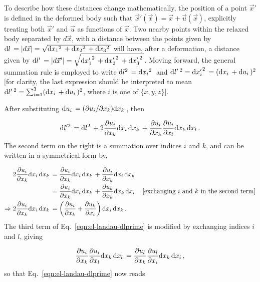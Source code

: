 To describe how these distances change mathematically, the position of a point $\vec{x}'$ is defined in the deformed body such that $\vec{x}'(\vec{x}) = \vec{x} + \vec{u}(\vec{x})$, explicitly treating both $\vec{x}'$ and $\vec{u}$ as functions of $\vec{x}$.  Two nearby points within the relaxed body separated by $d\vec{x}$, with a distance between the points given by ${\text{d}l}\, = |d\vec{x}| = \sqrt{{\text{d}{x_1}^2}\, + {\text{d}{x_2}^2}\, + {\text{d}{x_3}^2}\,}$ will have, after a deformation, a distance given by ${\text{d}l'}\, = |d\vec{x}'| = \sqrt{{\text{d}{x'_1}^2}\, + {\text{d}{x'_2}^2}\, + {\text{d}{x'_3}^2}\,}$.  Moving forward, the general summation rule is employed to write ${\text{d}l^2}\, = {\text{d}{x_i}^2}\,$ and ${\text{d}l'}\,^2 = {\text{d}{x'_i}^2}\, = ({\text{d}x_i}\, + {\text{d}u_i}\,)^2$ [for clarity, the last expression should be interpreted to mean ${\text{d}l'}\,^2 = \sum_{i=1}^{3} ({\text{d}x_i}\, + {\text{d}u_i}\,)^2$, where $i$ is one of $\{x, y, z\}$].

After substituting ${\text{d}u_i}\, = (\partial u_i/\partial x_k){\text{d}x_k}\,$, then

\begin{equation}\label{eqn:el-landau-dlprime}
{\text{d}l'^2}\, = {\text{d}l^2}\, + 2 \frac{\partial u_i}{\partial x_k}{\text{d}x_i}\, {\text{d}x_k}\, + \frac{\partial u_i}{\partial x_k}\frac{\partial u_i}{\partial x_l}{\text{d}x_k}\,{\text{d}x_l}\,.
\end{equation}
%
The second term on the right is a summation over indices $i$ and $k$, and can be written in a symmetrical form by,

\begin{align*}
2 \frac{\partial u_i}{\partial x_k}{\text{d}x_i}\, {\text{d}x_k}\, 
    &= \frac{\partial u_i}{\partial x_k} {\text{d}x_i}\, {\text{d}x_k}\, + \frac{\partial u_i}{\partial x_k} {\text{d}x_i}\, {\text{d}x_k}\, \\
    &= \frac{\partial u_i}{\partial x_k} {\text{d}x_i}\, {\text{d}x_k}\, + \frac{\partial u_k}{\partial x_k} {\text{d}x_k}\, {\text{d}x_i}\, & \text{[exchanging $i$ and $k$ in the second term]} \\
\Rightarrow 2 \frac{\partial u_i}{\partial x_k}{\text{d}x_i}\, {\text{d}x_k}\, &= \left( \frac{\partial u_i}{\partial x_k} + \frac{\partial u_k}{\partial x_i}\right) {\text{d}x_i}\, {\text{d}x_k}\,. 
\end{align*}
%
The third term of Eq.~\ref{eqn:el-landau-dlprime} is modified by exchanging indices $i$ and $l$, giving

\begin{equation*}
\frac{\partial u_i}{\partial x_k}\frac{\partial u_i}{\partial x_l}{\text{d}x_k}\,{\text{d}x_l}\, = \frac{\partial u_l}{\partial x_k} \frac{\partial u_l}{\partial x_i}{\text{d}x_k}\,{\text{d}x_i}\,,
\end{equation*}
%
so that Eq.~\ref{eqn:el-landau-dlprime} now reads

